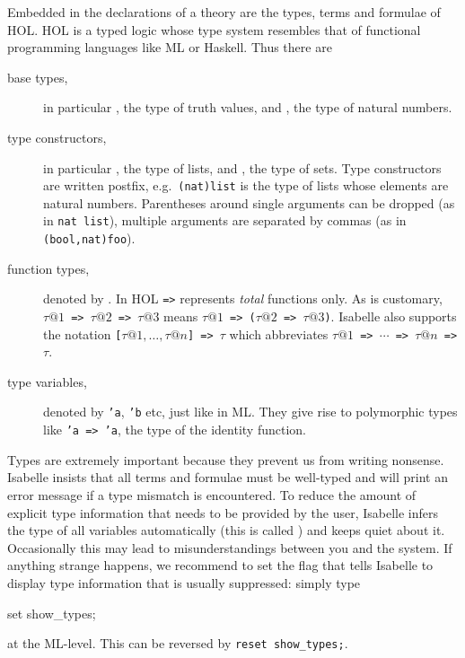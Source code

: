 Embedded in the declarations of a theory are the types, terms and formulae of
HOL. HOL is a typed logic whose type system resembles that of functional
programming languages like ML or Haskell. Thus there are
\begin{description}
\item[base types,] in particular , the type of truth values,
and , the type of natural numbers.
\item[type constructors,] in particular , the type of
lists, and , the type of sets. Type constructors are written
postfix, e.g.\ \texttt{(nat)list} is the type of lists whose elements are
natural numbers. Parentheses around single arguments can be dropped (as in
\texttt{nat list}), multiple arguments are separated by commas (as in
\texttt{(bool,nat)foo}).
\item[function types,] denoted by \ttindexbold{=>}. In HOL
\texttt{=>} represents {\em total} functions only. As is customary,
\texttt{$\tau@1$ => $\tau@2$ => $\tau@3$} means
\texttt{$\tau@1$ => ($\tau@2$ => $\tau@3$)}. Isabelle also supports the
notation \texttt{[$\tau@1,\dots,\tau@n$] => $\tau$} which abbreviates
\texttt{$\tau@1$ => $\cdots$ => $\tau@n$ => $\tau$}.
\item[type variables,] denoted by \texttt{'a}, \texttt{'b} etc, just like in
ML. They give rise to polymorphic types like \texttt{'a => 'a}, the type of the
identity function.
\end{description}
\begin{warn}
  Types are extremely important because they prevent us from writing
  nonsense.  Isabelle insists that all terms and formulae must be well-typed
  and will print an error message if a type mismatch is encountered. To
  reduce the amount of explicit type information that needs to be provided by
  the user, Isabelle infers the type of all variables automatically (this is
  called ) and keeps quiet about it. Occasionally
  this may lead to misunderstandings between you and the system. If anything
  strange happens, we recommend to set the flag  that
  tells Isabelle to display type information that is usually suppressed:
  simply type
\begin{ttbox}
set show_types;
\end{ttbox}

\noindent
at the ML-level. This can be reversed by \texttt{reset show_types;}.
\end{warn}


